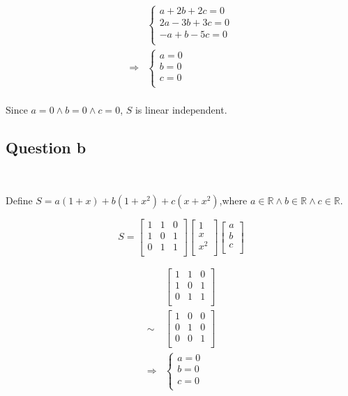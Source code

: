 \documentclass{article}
\def\R{\mathbb{R}}
\begin{document}
\begin{equation}
\tag{3.1-2}
\begin{split}
&\begin{cases}
a+2b+2c=0\\
2a-3b+3c=0\\
-a+b-5c=0\\
\end{cases}\\
\Rightarrow &\begin{cases}
a=0\\
b=0\\
c=0\\
\end{cases}\\
\end{split}
\end{equation}

Since $a=0\land b=0\land c=0$, $S$ is linear independent.

\subsection{Question b}

~

Define $S=a(1+x)+b(1+x^2)+c(x+x^2)$,where $a \in \R\land b\in\R\land c\in \R$.

\begin{equation}
\tag{3.2-1}
S = \begin{bmatrix}
1&1&0\\
1&0&1\\
0&1&1\\
\end{bmatrix}
\begin{bmatrix}
1\\
x\\
x^2\\
\end{bmatrix}
\begin{bmatrix}
a\\
b\\
c\\
\end{bmatrix}
\end{equation}

\begin{equation}
\tag{3.2-2}
\begin{split}
&\begin{bmatrix}
1&1&0\\
1&0&1\\
0&1&1\\
\end{bmatrix}\\
\sim &\begin{bmatrix}
1&0&0\\
0&1&0\\
0&0&1\\
\end{bmatrix}\\
\Rightarrow &\begin{cases}
a=0\\
b=0\\
c=0\\
\end{cases}
\end{split}
\end{equation}
\end{document}
